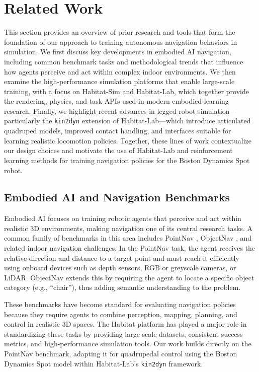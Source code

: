 \documentclass{article} %
\begin{document}
\section{Related Work}
This section provides an overview of prior research and tools that form the foundation of our approach to training autonomous navigation behaviors in simulation. We first discuss key developments in embodied AI navigation, including common benchmark tasks and methodological trends that influence how agents perceive and act within complex indoor environments. We then examine the high-performance simulation platforms that enable large-scale training, with a focus on Habitat-Sim and Habitat-Lab, which together provide the rendering, physics, and task APIs used in modern embodied learning research. Finally, we highlight recent advances in legged robot simulation—particularly the \texttt{kin2dyn} extension of Habitat-Lab—which introduce articulated quadruped models, improved contact handling, and interfaces suitable for learning realistic locomotion policies. Together, these lines of work contextualize our design choices and motivate the use of Habitat-Lab and reinforcement learning methods for training navigation policies for the Boston Dynamics Spot robot.

\subsection{Embodied AI and Navigation Benchmarks}
Embodied AI focuses on training robotic agents that perceive and act within realistic 3D environments, making navigation one of its central research tasks. A common family of benchmarks in this area includes PointNav \cite{zhao2021surprising}, ObjectNav \cite{batra2020objectnav}, and related indoor navigation challenges. In the PointNav task, the agent receives the relative direction and distance to a target point and must reach it efficiently using onboard devices such as depth sensors, RGB or greyscale cameras, or LiDAR. ObjectNav extends this by requiring the agent to locate a specific object category (e.g., “chair”), thus adding semantic understanding to the problem.

These benchmarks have become standard for evaluating navigation policies because they require agents to combine perception, mapping, planning, and control in realistic 3D spaces. The Habitat platform has played a major role in standardizing these tasks by providing large-scale datasets, consistent success metrics, and high-performance simulation tools. Our work builds directly on the PointNav benchmark, adapting it for quadrupedal control using the Boston Dynamics Spot model within Habitat-Lab’s \texttt{kin2dyn} framework.
\end{document}
